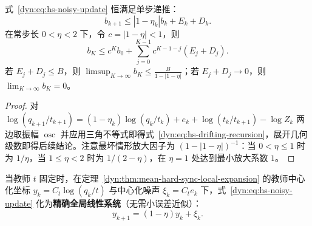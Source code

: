 \documentclass[lang=cn,scheme=chinese,openany]{elegantbook}
\begin{document}
\begin{theorem}
\label{dyn:thm:hs-input-state}
式~\eqref{dyn:eq:hs-noisy-update} 恒满足单步递推：
\begin{equation}\label{dyn:eq:hs-drifting-recursion}
 b_{k+1}\leq |1-\eta_k|b_k+E_k+D_k.
\end{equation}
在常步长 $0<\eta<2$ 下，令 $c=|1-\eta|<1$，则
\begin{equation*}
 b_K\leq c^K b_0+\sum_{j=0}^{K-1}c^{K-1-j}(E_j+D_j).
\end{equation*}
若 $E_j+D_j\leq B$，则 $\limsup_{K\to\infty} b_K\leq \frac{B}{1-|1-\eta|}$；若 $E_j+D_j\to0$，则 $\lim_{K\to\infty}b_K=0$。
\end{theorem}
\begin{proof}
对 $\log(q_{k+1}/t_{k+1})=(1-\eta_k)\log(q_k/t_k)+e_k+\log(t_k/t_{k+1})-\log Z_k$ 两边取振幅 $\operatorname{osc}$ 并应用三角不等式即得式~\eqref{dyn:eq:hs-drifting-recursion}，展开几何级数即得后续结论。注意最坏情形放大因子为 $(1-|1-\eta|)^{-1}$：当 $0<\eta\le 1$ 时为 $1/\eta$，当 $1\le\eta<2$ 时为 $1/(2-\eta)$，在 $\eta=1$ 处达到最小放大系数 $1$。
\end{proof}

当教师 $t$ 固定时，在定理~\ref{dyn:thm:mean-hard-sync-local-expansion} 的教师中心化坐标 $y_k=C_t\log(q_k/t)$ 与中心化噪声 $\xi_k=C_t e_k$ 下，式~\eqref{dyn:eq:hs-noisy-update} 化为\textbf{精确全局线性系统}（无需小误差近似）：
\begin{equation}\label{dyn:eq:hs-centered-linear}
 y_{k+1}=(1-\eta)y_k+\xi_k.
\end{equation}
\end{document}
